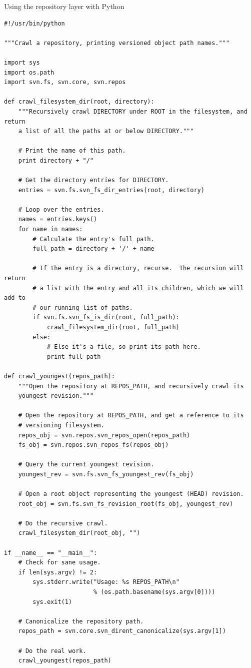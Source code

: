 \protect{}\label{svn.developer.usingapi.otherlangs.ex-1}
Using the repository layer with Python

\begin{verbatim}
#!/usr/bin/python

"""Crawl a repository, printing versioned object path names."""

import sys
import os.path
import svn.fs, svn.core, svn.repos

def crawl_filesystem_dir(root, directory):
    """Recursively crawl DIRECTORY under ROOT in the filesystem, and return
    a list of all the paths at or below DIRECTORY."""

    # Print the name of this path.
    print directory + "/"
    
    # Get the directory entries for DIRECTORY.
    entries = svn.fs.svn_fs_dir_entries(root, directory)

    # Loop over the entries.
    names = entries.keys()
    for name in names:
        # Calculate the entry's full path.
        full_path = directory + '/' + name

        # If the entry is a directory, recurse.  The recursion will return
        # a list with the entry and all its children, which we will add to
        # our running list of paths.
        if svn.fs.svn_fs_is_dir(root, full_path):
            crawl_filesystem_dir(root, full_path)
        else:
            # Else it's a file, so print its path here.
            print full_path

def crawl_youngest(repos_path):
    """Open the repository at REPOS_PATH, and recursively crawl its
    youngest revision."""
    
    # Open the repository at REPOS_PATH, and get a reference to its
    # versioning filesystem.
    repos_obj = svn.repos.svn_repos_open(repos_path)
    fs_obj = svn.repos.svn_repos_fs(repos_obj)

    # Query the current youngest revision.
    youngest_rev = svn.fs.svn_fs_youngest_rev(fs_obj)
    
    # Open a root object representing the youngest (HEAD) revision.
    root_obj = svn.fs.svn_fs_revision_root(fs_obj, youngest_rev)

    # Do the recursive crawl.
    crawl_filesystem_dir(root_obj, "")
    
if __name__ == "__main__":
    # Check for sane usage.
    if len(sys.argv) != 2:
        sys.stderr.write("Usage: %s REPOS_PATH\n"
                         % (os.path.basename(sys.argv[0])))
        sys.exit(1)

    # Canonicalize the repository path.
    repos_path = svn.core.svn_dirent_canonicalize(sys.argv[1])

    # Do the real work.
    crawl_youngest(repos_path)
\end{verbatim}

